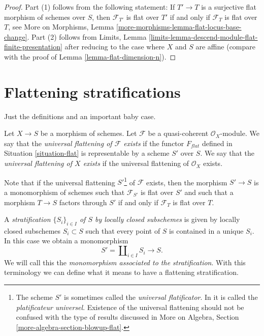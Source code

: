 \begin{proof}
Part (1) follows from the following statement: If $T' \to T$ is a surjective
flat morphism of schemes over $S$, then $\mathcal{F}_{T'}$ is flat over $T'$
if and only if $\mathcal{F}_T$ is flat over $T$, see
More on Morphisms, Lemma \ref{more-morphisms-lemma-flat-locus-base-change}.
Part (2) follows from
Limits, Lemma \ref{limits-lemma-descend-module-flat-finite-presentation}
after reducing to the case where $X$ and $S$ are affine (compare with
the proof of
Lemma \ref{lemma-flat-dimension-n}).
\end{proof}




\section{Flattening stratifications}
\label{section-flattening}

\noindent
Just the definitions and an important baby case.

\begin{definition}
\label{definition-flattening}
Let $X \to S$ be a morphism of schemes.
Let $\mathcal{F}$ be a quasi-coherent $\mathcal{O}_X$-module.
We say that the {\it universal flattening of $\mathcal{F}$ exists}
if the functor $F_{flat}$ defined in Situation \ref{situation-flat}
is representable by a scheme $S'$ over $S$.
We say that the {\it universal flattening of $X$ exists}
if the universal flattening of $\mathcal{O}_X$ exists.
\end{definition}

\noindent
Note that if the universal flattening $S'$\footnote{The scheme $S'$ is sometimes
called the {\it universal flatificator}. In \cite{GruRay} it is called
the {\it platificateur universel}. Existence of the universal flattening
should not be confused with the type of results discussed in
More on Algebra, Section \ref{more-algebra-section-blowup-flat}.} of
$\mathcal{F}$ exists, then the morphism $S' \to S$ is a monomorphism of schemes
such that $\mathcal{F}_{S'}$ is flat over $S'$ and such that a
morphism $T \to S$ factors through $S'$ if and only if $\mathcal{F}_T$
is flat over $T$.

\medskip\noindent
A {\it stratification $\{S_i\}_{i \in I}$ of $S$ by locally closed
subschemes} is given by locally closed subschemes $S_i \subset S$
such that every point of $S$ is contained in a unique $S_i$.
In this case we obtain a monomorphism
$$
S' = \coprod\nolimits_{i \in I} S_i \longrightarrow S.
$$
We will call this the {\it monomorphism associated to the stratification}.
With this terminology we can define what it means to have a flattening
stratification.

